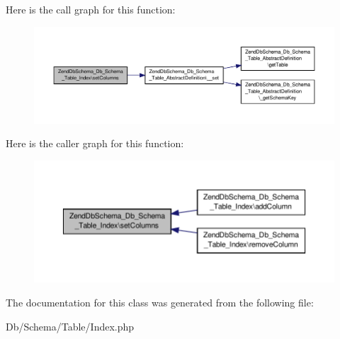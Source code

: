 Here is the call graph for this function\-:\nopagebreak
\begin{figure}[H]
\begin{center}
\leavevmode
\includegraphics[width=350pt]{classZendDbSchema__Db__Schema__Table__Index_a77b65e961a7da9ca89fdebd682338fcf_cgraph}
\end{center}
\end{figure}




Here is the caller graph for this function\-:\nopagebreak
\begin{figure}[H]
\begin{center}
\leavevmode
\includegraphics[width=350pt]{classZendDbSchema__Db__Schema__Table__Index_a77b65e961a7da9ca89fdebd682338fcf_icgraph}
\end{center}
\end{figure}




The documentation for this class was generated from the following file\-:\begin{DoxyCompactItemize}
\item 
Db/\-Schema/\-Table/Index.\-php\end{DoxyCompactItemize}
